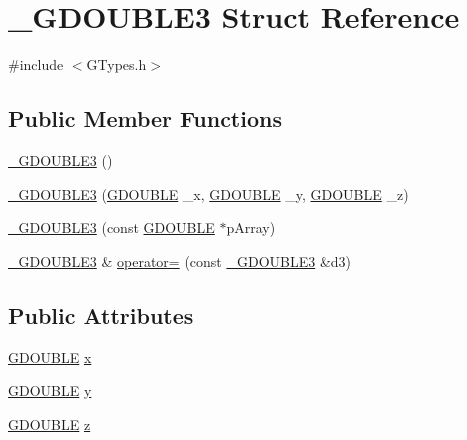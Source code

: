 \hypertarget{struct___g_d_o_u_b_l_e3}{}\section{\+\_\+\+G\+D\+O\+U\+B\+L\+E3 Struct Reference}
\label{struct___g_d_o_u_b_l_e3}


{\ttfamily \#include $<$G\+Types.\+h$>$}

\subsection*{Public Member Functions}
\begin{DoxyCompactItemize}
\item 
\hyperlink{struct___g_d_o_u_b_l_e3_a0deb53a6fea98c102d8e47d07286a994}{\+\_\+\+G\+D\+O\+U\+B\+L\+E3} ()
\item 
\hyperlink{struct___g_d_o_u_b_l_e3_a18801e34ffa0887765dbe359641d41c1}{\+\_\+\+G\+D\+O\+U\+B\+L\+E3} (\hyperlink{_g_types_8h_afd05ac85f90ee8e2a733928545462cd4}{G\+D\+O\+U\+B\+L\+E} \+\_\+x, \hyperlink{_g_types_8h_afd05ac85f90ee8e2a733928545462cd4}{G\+D\+O\+U\+B\+L\+E} \+\_\+y, \hyperlink{_g_types_8h_afd05ac85f90ee8e2a733928545462cd4}{G\+D\+O\+U\+B\+L\+E} \+\_\+z)
\item 
\hyperlink{struct___g_d_o_u_b_l_e3_a043bbef696b0974418bc1d5a5002f695}{\+\_\+\+G\+D\+O\+U\+B\+L\+E3} (const \hyperlink{_g_types_8h_afd05ac85f90ee8e2a733928545462cd4}{G\+D\+O\+U\+B\+L\+E} $\ast$p\+Array)
\item 
\hyperlink{struct___g_d_o_u_b_l_e3}{\+\_\+\+G\+D\+O\+U\+B\+L\+E3} \& \hyperlink{struct___g_d_o_u_b_l_e3_adc8ee9f1450857887e87343353e72dcc}{operator=} (const \hyperlink{struct___g_d_o_u_b_l_e3}{\+\_\+\+G\+D\+O\+U\+B\+L\+E3} \&d3)
\end{DoxyCompactItemize}
\subsection*{Public Attributes}
\begin{DoxyCompactItemize}
\item 
\hyperlink{_g_types_8h_afd05ac85f90ee8e2a733928545462cd4}{G\+D\+O\+U\+B\+L\+E} \hyperlink{struct___g_d_o_u_b_l_e3_a70a5cc5ec6492148f8a6556ec6a22545}{x}
\item 
\hyperlink{_g_types_8h_afd05ac85f90ee8e2a733928545462cd4}{G\+D\+O\+U\+B\+L\+E} \hyperlink{struct___g_d_o_u_b_l_e3_afe5e26ac1af98b8db79879d59e6c8921}{y}
\item 
\hyperlink{_g_types_8h_afd05ac85f90ee8e2a733928545462cd4}{G\+D\+O\+U\+B\+L\+E} \hyperlink{struct___g_d_o_u_b_l_e3_a6df02e180c581059e7eed34f72ac3e34}{z}
\end{DoxyCompactItemize}



